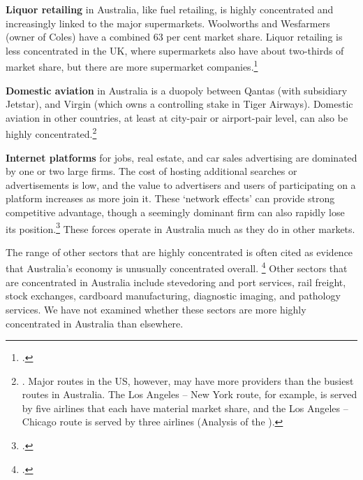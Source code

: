 \textbf{Liquor retailing} in Australia, like fuel retailing, is highly concentrated and increasingly linked to the major supermarkets. Woolworths and Wesfarmers (owner of Coles) have a combined 63 per cent market share. Liquor retailing is less concentrated in the UK, where supermarkets also have about two-thirds of market share, but there are more supermarket companies.\footcite{IAS_liquor_UK}

\textbf{Domestic aviation} in Australia is a duopoly between Qantas (with subsidiary Jetstar), and Virgin (which owns a controlling stake in Tiger Airways). Domestic aviation in other countries, at least at city-pair or airport-pair level, can also be highly concentrated.\footnote{\textcite{GAO_Airlines_US}. Major routes in the US, however, may have more providers than the busiest routes in Australia. The Los Angeles -- New York route, for example, is served by five airlines that each have material market share, and the Los Angeles -- Chicago route is served by three airlines (Analysis of the \cite{DOT-2017-Origin-Dest-Survey}).}


\textbf{Internet platforms} for jobs, real estate, and car sales advertising are dominated by one or two large firms. The cost of hosting additional searches or advertisements is low, and the value to advertisers and users of participating on a platform increases as more join it. These `network effects' can provide strong competitive advantage, though a seemingly dominant firm can also rapidly lose its position.\footcites{Charney_Recruitment_2015, Dean_RE_2017, Graham_RE_2017, IBISWorldIndustry2017} 
These forces operate in Australia much as they do in other markets. 

The range of other sectors that are highly concentrated is often cited as evidence that Australia's economy is unusually concentrated overall.%
\footcite{Macrobusiness_duopoly_2017} Other sectors that are concentrated in Australia include stevedoring and port services, rail freight, stock exchanges, cardboard manufacturing, diagnostic imaging, and pathology services. We have not examined whether these sectors are more highly concentrated in Australia than elsewhere. 

